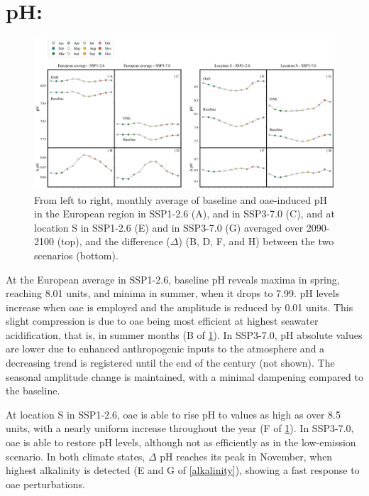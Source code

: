 \section{pH:}

\begin{figure}[H]
\caption[Monthly average of baseline and \texorpdfstring{OAE}{OAE}-induced pH]{From left to right, monthly average of baseline and \ac{oae}-induced pH in the European region in SSP1-2.6 (A), and in SSP3-7.0 (C), and at location S in SSP1-2.6 (E) and in SSP3-7.0 (G) averaged over 2090-2100 (top), and the difference ($\Delta$) (B, D, F, and H) between the two scenarios (bottom).}
\label{ph}
\centering
\includegraphics[width=15cm]{fig/3_Results/pH/ph.png}

\end{figure}

At the European average in SSP1-2.6, baseline pH reveals maxima in spring, reaching 8.01 units, and minima in summer, when it drops to 7.99. pH levels increase when \ac{oae} is employed and the amplitude is reduced by 0.01 units. This slight compression is due to \ac{oae} being most efficient at highest seawater acidification, that is, in summer months (B of \cref{ph}). In SSP3-7.0, pH absolute values are lower due to enhanced anthropogenic  inputs to the atmosphere and a decreasing trend is registered until the end of the century (not shown). The seasonal amplitude change is maintained, with a minimal dampening compared to the baseline. 

At location S in SSP1-2.6, \ac{oae} is able to rise pH to values as high as over 8.5 units, with a nearly uniform increase throughout the year (F of \cref{ph}). In SSP3-7.0, \ac{oae} is able to restore pH levels, although not as efficiently as in the low-emission scenario. In both climate states, $\Delta$ pH reaches its peak in November, when highest alkalinity is detected (E and G of \cref{alkalinity}), showing a fast response to \ac{oae} perturbations. 

